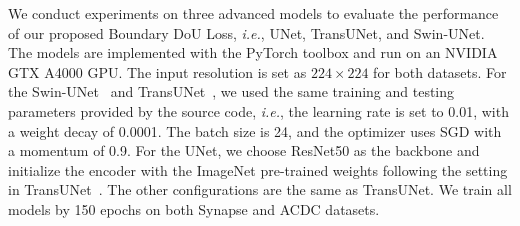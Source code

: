 \documentclass[runningheads]{llncs}
\begin{document}
We conduct experiments on three advanced models to evaluate the performance of our proposed Boundary DoU Loss, \textit{i.e.}, UNet, TransUNet, and Swin-UNet. The models are implemented with the PyTorch toolbox and run on an NVIDIA GTX A4000 GPU. The input resolution is set as $224\times 224$ for both datasets. For the Swin-UNet~\cite{cao2021swin} and TransUNet~\cite{chen2021transunet}, we used the same training and testing parameters provided by the source code, \textit{i.e.}, the learning rate is set to 0.01, with a weight decay of 0.0001. The batch size is 24, and the optimizer uses SGD with a momentum of 0.9. For the UNet, we choose ResNet50 as the backbone and initialize the encoder with the ImageNet pre-trained weights following the setting in TransUNet~\cite{chen2021transunet}. The other configurations are the same as TransUNet. We train all models by 150 epochs on both Synapse and ACDC datasets.


\end{document}
